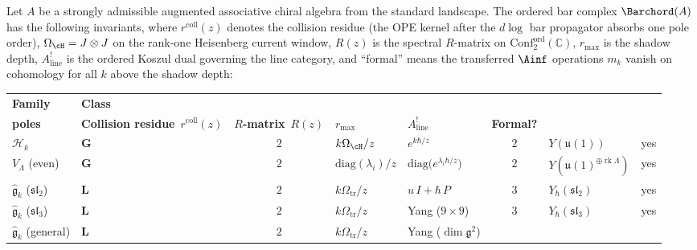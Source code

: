 \begin{theorem}%
\label{thm:e1-ordered-bar-landscape}%
%
%
%
Let\/ $A$ be a strongly admissible augmented associative chiral
algebra from the standard landscape. The ordered bar complex\/
$\Barchord(A)$ has the following invariants, where\/ $r^{\mathrm{coll}}(z)$
denotes the collision residue
\textup{(}the OPE kernel after the $d\log$ bar propagator
absorbs one pole order\textup{)}, $\Omega_{\cH}=J\otimes J$ on the
rank-one Heisenberg current window,
$R(z)$ is the spectral $R$-matrix on
$\mathrm{Conf}_2^{\mathrm{ord}}(\mathbb{C})$,
$r_{\max}$ is the shadow depth,
$A^!_{\mathrm{line}}$ is the ordered Koszul dual governing the
line category, and
``formal'' means the transferred $\Ainf$ operations
$m_k$ vanish on cohomology for all $k$ above the shadow depth:
\begin{center}
\small
\renewcommand{\arraystretch}{1.5}
\begin{tabular}{llcllcll}
\toprule
\textbf{Family}
 & \textbf{Class}
 & \makecell{\textbf{OPE} \\ \textbf{poles}}
 & \textbf{Collision residue}~$r^{\mathrm{coll}}(z)$
 & \textbf{$R$-matrix}~$R(z)$
 & $r_{\max}$
 & $A^!_{\mathrm{line}}$
 & \textbf{Formal?} \\
\midrule
$\mathcal{H}_k$
 & $\mathbf{G}$ & $2$
 & $k\Omega_{\cH}/z$
 & $e^{k\hbar/z}$
 & $2$
 & $Y(\mathfrak{u}(1))$\rlap{\textsuperscript{$\dagger$}}
 & yes \\[3pt]
$V_\Lambda$ \textup{(even)}
 & $\mathbf{G}$ & $2$
 & $\mathrm{diag}(\lambda_i)/z$
 & $\mathrm{diag}\bigl(e^{\lambda_i\hbar/z}\bigr)$
 & $2$
 & $Y(\mathfrak{u}(1)^{\oplus\operatorname{rk}\Lambda})$\rlap{\textsuperscript{$\dagger$}}
 & yes \\[3pt]
$\widehat{\mathfrak{g}}_k$\; ($\mathfrak{sl}_2$)
 & $\mathbf{L}$ & $2$
 & $k\Omega_{\mathrm{tr}}/z$\rlap{\textsuperscript{$\ddagger$}}
 & $u\,I + \hbar\,P$
 & $3$
 & $Y_\hbar(\mathfrak{sl}_2)$
 & yes \\[3pt]
$\widehat{\mathfrak{g}}_k$\; ($\mathfrak{sl}_3$)
 & $\mathbf{L}$ & $2$
 & $k\Omega_{\mathrm{tr}}/z$\rlap{\textsuperscript{$\ddagger$}}
 & Yang ($9{\times}9$)
 & $3$
 & $Y_\hbar(\mathfrak{sl}_3)$
 & yes \\[3pt]
$\widehat{\mathfrak{g}}_k$\; (general)
 & $\mathbf{L}$ & $2$
 & $k\Omega_{\mathrm{tr}}/z$\rlap{\textsuperscript{$\ddagger$}}
 & Yang ($\dim\mathfrak{g}^2$)

\end{tabular}
\end{center}
\end{theorem}

